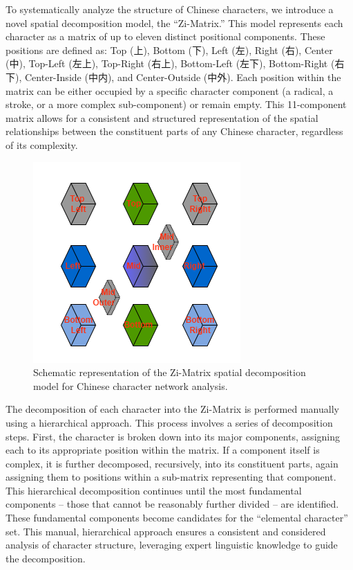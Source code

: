 To systematically analyze the structure of Chinese characters, we
introduce a novel spatial decomposition model, the ``Zi-Matrix.'' This
model represents each character as a matrix of up to eleven distinct
positional components. These positions are defined as: Top (上), Bottom
(下), Left (左), Right (右), Center (中), Top-Left (左上), Top-Right
(右上), Bottom-Left (左下), Bottom-Right (右下), Center-Inside (中内),
and Center-Outside (中外). Each position within the matrix can be either
occupied by a specific character component (a radical, a stroke, or a
more complex sub-component) or remain empty. This 11-component matrix
allows for a consistent and structured representation of the spatial
relationships between the constituent parts of any Chinese character,
regardless of its complexity.

\begin{figure}
\centering
\includegraphics{./images/zi-matrix.png}
\caption{Schematic representation of the Zi-Matrix spatial decomposition
model for Chinese character network analysis.}
\end{figure}

The decomposition of each character into the Zi-Matrix is performed
manually using a hierarchical approach. This process involves a series
of decomposition steps. First, the character is broken down into its
major components, assigning each to its appropriate position within the
matrix. If a component itself is complex, it is further decomposed,
recursively, into its constituent parts, again assigning them to
positions within a sub-matrix representing that component. This
hierarchical decomposition continues until the most fundamental
components -- those that cannot be reasonably further divided -- are
identified. These fundamental components become candidates for the
``elemental character'' set. This manual, hierarchical approach ensures
a consistent and considered analysis of character structure, leveraging
expert linguistic knowledge to guide the decomposition.

